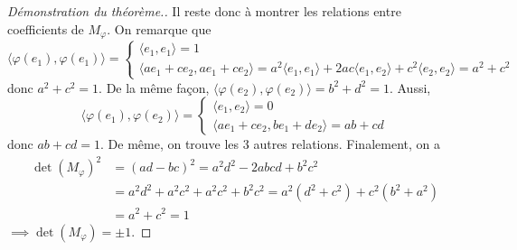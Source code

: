 \documentclass{book}
\numberwithin{equation}{section}
\renewcommand{\phi}{\varphi}
\providecommand{\scalaire}[1]{{\langle#1\rangle}}
\begin{document}
\begin{proof}[Démonstration du théorème.]
	Il reste donc à montrer les relations entre coefficients de $M_\phi$. On remarque que
	\begin{equation*}
		\scalaire{\phi(e_1), \phi(e_1)} =
		\begin{cases}
			\scalaire{e_1, e_1} = 1\\
			\scalaire{ae_1 + ce_2, ae_1 + ce_2} = a^2\scalaire{e_1, e_1} + 2ac\scalaire{e_1, e_2} + c^2\scalaire{e_2, e_2} = a^2 + c^2
		\end{cases}
	\end{equation*}
	donc $a^2 + c^2 = 1$. De la même façon, $\scalaire{\phi(e_2), \phi(e_2)} = b^2 + d^2 = 1$. Aussi,
	\begin{equation*}
		\scalaire{\phi(e_1), \phi(e_2)} =
		\begin{cases}
			\scalaire{e_1, e_2} = 0\\
			\scalaire{ae_1 + ce_2, be_1 + de_2} = ab + cd
		\end{cases}
	\end{equation*}
	donc $ab + cd = 1$. De même, on trouve les 3 autres relations. Finalement, on a
	\begin{align*}
		\det(M_\phi)^2 &= (ad - bc)^2 = a^2d^2 - 2abcd + b^2c^2\\
		&= a^2d^2 + a^2c^2 + a^2c^2 + b^2c^2 = a^2(d^2 + c^2) + c^2(b^2 + a^2)\\
		&= a^2 + c^2 = 1
	\end{align*}
	$\implies \det(M_\phi) = \pm 1$.
\end{proof}
\end{document}
